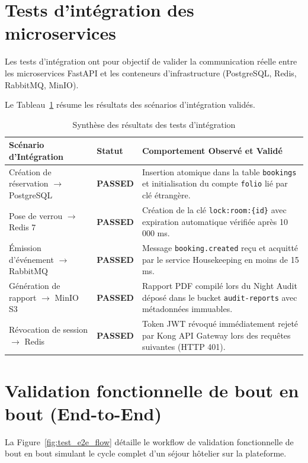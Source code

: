 \section{Tests d'intégration des microservices}

Les tests d'intégration ont pour objectif de valider la communication réelle entre les microservices FastAPI et les conteneurs d'infrastructure (PostgreSQL, Redis, RabbitMQ, MinIO).

Le Tableau~\ref{tab:tests_integration_detail} résume les résultats des scénarios d'intégration validés.

\begin{table}[H]
\centering
\small
\renewcommand{\arraystretch}{1.3}
\begin{tabularx}{\textwidth}{|p{4.2cm}|p{1.8cm}|X|}
\hline
\textbf{Scénario d'Intégration} & \textbf{Statut} & \textbf{Comportement Observé et Validé} \\
\hline
Création de réservation $\rightarrow$ PostgreSQL & \textbf{PASSED} & Insertion atomique dans la table \texttt{bookings} et initialisation du compte \texttt{folio} lié par clé étrangère. \\
\hline
Pose de verrou $\rightarrow$ Redis 7 & \textbf{PASSED} & Création de la clé \texttt{lock:room:\{id\}} avec expiration automatique vérifiée après 10 000 ms. \\
\hline
Émission d'événement $\rightarrow$ RabbitMQ & \textbf{PASSED} & Message \texttt{booking.created} reçu et acquitté par le service Housekeeping en moins de 15 ms. \\
\hline
Génération de rapport $\rightarrow$ MinIO S3 & \textbf{PASSED} & Rapport PDF compilé lors du Night Audit déposé dans le bucket \texttt{audit-reports} avec métadonnées immuables. \\
\hline
Révocation de session $\rightarrow$ Redis & \textbf{PASSED} & Token JWT révoqué immédiatement rejeté par Kong API Gateway lors des requêtes suivantes (HTTP 401). \\
\hline
\end{tabularx}
\caption{Synthèse des résultats des tests d'intégration}
\label{tab:tests_integration_detail}
\end{table}

\section{Validation fonctionnelle de bout en bout (End-to-End)}

La Figure~\ref{fig:test_e2e_flow} détaille le workflow de validation fonctionnelle de bout en bout simulant le cycle complet d'un séjour hôtelier sur la plateforme.

